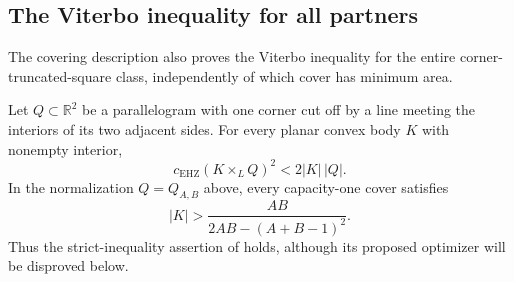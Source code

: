 \subsection{The Viterbo inequality for all partners}

The covering description also proves the Viterbo inequality for the entire
corner-truncated-square class, independently of which cover has minimum area.

\begin{theorem}\label{thm:truncated-global-viterbo}
Let $Q\subset\mathbb R^2$ be a parallelogram with one corner cut off by a
line meeting the interiors of its two adjacent sides. For every planar
convex body $K$ with nonempty interior,
\[
 c_{\mathrm{EHZ}}(K\times_L Q)^2<2|K|\,|Q|.
\]
In the normalization $Q=Q_{A,B}$ above, every capacity-one cover satisfies
\begin{equation}\label{eq:truncated-global-area}
 |K|>\frac{AB}{2AB-(A+B-1)^2}.
\end{equation}
Thus the strict-inequality assertion of \cite[Conjecture~6.1]{BMP2026}
holds, although its proposed optimizer will be disproved below.
\end{theorem}

